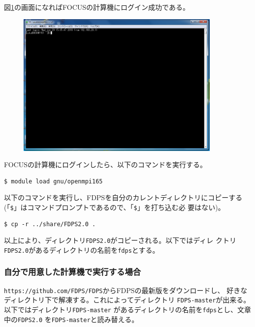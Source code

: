 \documentclass[12pt,a4paper,dvipdfmx]{jarticle}
\begin{document}
図\ref{fig:teraterm8}の画面になればFOCUSの計算機にログイン成功である。

\begin{figure}
  \begin{center}
    \includegraphics[clip, width=10.0cm]{./fig/teraterm8_.png}
  \end{center}
  \caption{}
  \label{fig:teraterm8}
\end{figure}

FOCUSの計算機にログインしたら、以下のコマンドを実行する。
\begin{screen}
\begin{verbatim}
$ module load gnu/openmpi165
\end{verbatim}
\end{screen}

以下のコマンドを実行し、FDPSを自分のカレントディレクトリにコピーする
(「\verb|$|」はコマンドプロンプトであるので、「\verb|$|」を打ち込む必
要はない)。
\begin{screen}
\begin{verbatim}
$ cp -r ../share/FDPS2.0 .
\end{verbatim}
\end{screen}
以上により、ディレクトリ\texttt{FDPS2.0}がコピーされる。以下ではディレ
クトリ\texttt{FDPS2.0}があるディレクトリの名前を\texttt{fdps}とする。

\subsubsection{自分で用意した計算機で実行する場合}
\texttt{https://github.com/FDPS/FDPS}からFDPSの最新版をダウンロードし、
好きなディレクトリ下で解凍する。これによってディレクトリ
\texttt{FDPS-master}が出来る。以下ではディレクトリ\texttt{FDPS-master}
があるディレクトリの名前を\texttt{fdps}とし、文章中の\texttt{FDPS2.0}
を\texttt{FDPS-master}と読み替える。
\end{document}
